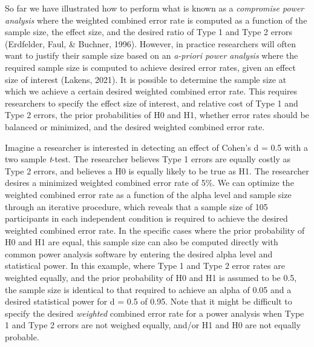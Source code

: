 \documentclass[
  english,
  ,man, a4paper,floatsintext]{apa6}
\begin{document}
So far we have illustrated how to perform what is known as a \emph{compromise power analysis} where the weighted combined error rate is computed as a function of the sample size, the effect size, and the desired ratio of Type 1 and Type 2 errors (Erdfelder, Faul, \& Buchner, 1996). However, in practice researchers will often want to justify their sample size based on an \emph{a-priori power analysis} where the required sample size is computed to achieve desired error rates, given an effect size of interest (Lakens, 2021). It is possible to determine the sample size at which we achieve a certain desired weighted combined error rate. This requires researchers to specify the effect size of interest, and relative cost of Type 1 and Type 2 errors, the prior probabilities of H0 and H1, whether error rates should be balanced or minimized, and the desired weighted combined error rate.

Imagine a researcher is interested in detecting an effect of Cohen's d = 0.5 with a two sample \emph{t}-test. The researcher believes Type 1 errors are equally costly as Type 2 errors, and believes a H0 is equally likely to be true as H1. The researcher desires a minimized weighted combined error rate of 5\%. We can optimize the weighted combined error rate as a function of the alpha level and sample size through an iterative procedure, which reveals that a sample size of 105 participants in each independent condition is required to achieve the desired weighted combined error rate. In the specific cases where the prior probability of H0 and H1 are equal, this sample size can also be computed directly with common power analysis software by entering the desired alpha level and statistical power. In this example, where Type 1 and Type 2 error rates are weighted equally, and the prior probability of H0 and H1 is assumed to be 0.5, the sample size is identical to that required to achieve an alpha of 0.05 and a desired statistical power for d = 0.5 of 0.95. Note that it might be difficult to specify the desired \emph{weighted} combined error rate for a power analysis when Type 1 and Type 2 errors are not weighed equally, and/or H1 and H0 are not equally probable.
\end{document}
